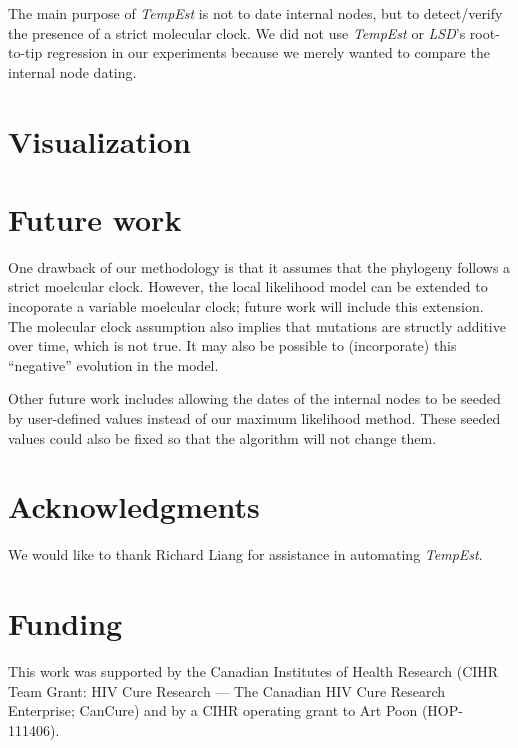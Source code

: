 \documentclass{bioinfo}
\begin{document}
The main purpose of \emph{TempEst} is not to date internal nodes, but to detect/verify the presence of a strict molecular clock.
We did not use \emph{TempEst} or \emph{LSD}'s root-to-tip regression in our experiments because we merely wanted to compare the internal node dating.

\section{Visualization}

\section{Future work} \label{sec:discuss}
One drawback of our methodology is that it assumes that the phylogeny follows a strict moelcular clock. However, the local likelihood model can be extended to incoporate a variable moelcular clock; future work will include this extension. The molecular clock assumption also implies that mutations are structly additive over time, which is not true. It may also be possible to (incorporate) this ``negative'' evolution in the model.

Other future work includes allowing the dates of the internal nodes to be seeded by user-defined values instead of our maximum likelihood method. These seeded values could also be fixed so that the algorithm will not change them.

\section*{Acknowledgments} \label{sec:ackn}
We would like to thank Richard Liang for assistance in automating \emph{TempEst}.

\section*{Funding} \label{sec:fund}
This work was supported by the Canadian Institutes of Health Research (CIHR Team Grant: HIV Cure Research --- The Canadian HIV Cure Research Enterprise; CanCure) and by a CIHR operating grant to Art Poon (HOP-111406).



\end{document}
